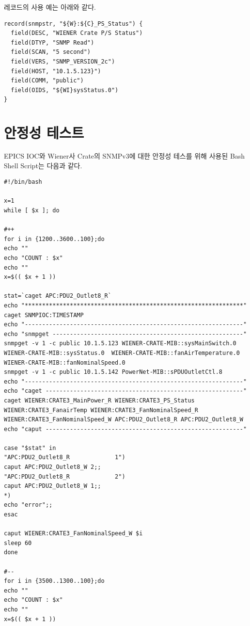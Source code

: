 \documentclass[11pt
  , a4paper
  , article
  , oneside
]{memoir}
\begin{document}
레코드의 사용 예는 아래와 같다.

{\scriptsize
\begin{lstlisting}[style=termstyle]
record(snmpstr, "${W}:${C}_PS_Status") {
  field(DESC, "WIENER Crate P/S Status") 
  field(DTYP, "SNMP Read")
  field(SCAN, "5 second")
  field(VERS, "SNMP_VERSION_2c")
  field(HOST, "10.1.5.123}")
  field(COMM, "public")
  field(OIDS, "${WI}sysStatus.0")
}
\end{lstlisting}
}

\clearpage
\chapter{안정성 테스트}
EPICS IOC와 Wiener사 Crate의 SNMPv3에 대한 안정성 테스를 위해 사용된 Bash Shell Script는 다음과 같다.

{\scriptsize
\begin{lstlisting}[style=termstyle]
#!/bin/bash

x=1
while [ $x ]; do

#++
for i in {1200..3600..100};do
echo ""
echo "COUNT : $x"
echo ""
x=$(( $x + 1 ))

stat=`caget APC:PDU2_Outlet8_R`
echo "***************************************************************"
caget SNMPIOC:TIMESTAMP
echo "---------------------------------------------------------------"
echo "snmpget -------------------------------------------------------"
snmpget -v 1 -c public 10.1.5.123 WIENER-CRATE-MIB::sysMainSwitch.0  WIENER-CRATE-MIB::sysStatus.0  WIENER-CRATE-MIB::fanAirTemperature.0 WIENER-CRATE-MIB::fanNominalSpeed.0
snmpget -v 1 -c public 10.1.5.142 PowerNet-MIB::sPDUOutletCtl.8
echo "---------------------------------------------------------------"
echo "caget ---------------------------------------------------------"
caget WIENER:CRATE3_MainPower_R WIENER:CRATE3_PS_Status WIENER:CRATE3_FanairTemp WIENER:CRATE3_FanNominalSpeed_R WIENER:CRATE3_FanNominalSpeed_W APC:PDU2_Outlet8_R APC:PDU2_Outlet8_W 
echo "caput ---------------------------------------------------------"

case "$stat" in
"APC:PDU2_Outlet8_R             1")
caput APC:PDU2_Outlet8_W 2;;
"APC:PDU2_Outlet8_R             2")
caput APC:PDU2_Outlet8_W 1;;
*)
echo "error";;
esac

caput WIENER:CRATE3_FanNominalSpeed_W $i
sleep 60
done

#--
for i in {3500..1300..100};do
echo ""
echo "COUNT : $x"
echo ""
x=$(( $x + 1 ))


\end{lstlisting}}
\end{document}
